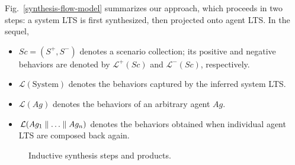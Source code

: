 Fig.~\ref{synthesis-flow-model} summarizes our approach, which proceeds in two steps: a system LTS is first synthesized, then projected onto agent LTS. In the sequel,
\begin{itemize}
\item $Sc = (S^+,S^-)$ denotes a scenario collection; its positive and negative behaviors are denoted by $\mathcal{L}^+(Sc)$ and $\mathcal{L}^-(Sc)$, respectively.
\item $\mathcal{L}(\mbox{System})$ denotes the behaviors captured by the inferred system LTS.
\item $\mathcal{L}(Ag)$ denotes the behaviors of an arbitrary agent $Ag$.
\item $\mathcal{L}(Ag_1 \parallel \ldots \parallel Ag_n)$ denotes the behaviors obtained when individual agent LTS are composed back again.
\end{itemize}

\begin{figure}\centering
{}
\caption{Inductive synthesis steps and products.\label{figure:synthesis-flow-model}} 
\end{figure}

